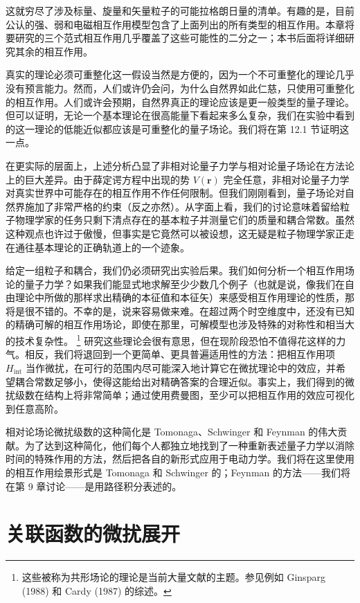 这就穷尽了涉及标量、旋量和矢量粒子的可能拉格朗日量的清单。有趣的是，目前公认的强、弱和电磁相互作用模型包含了上面列出的所有类型的相互作用。本章将要研究的三个范式相互作用几乎覆盖了这些可能性的二分之一；本书后面将详细研究其余的相互作用。

真实的理论必须可重整化这一假设当然是方便的，因为一个不可重整化的理论几乎没有预言能力。然而，人们或许仍会问，为什么自然界如此仁慈，只使用可重整化的相互作用。人们或许会预期，自然界真正的理论应该是更一般类型的量子理论。但可以证明，无论一个基本理论在很高能量下看起来多么复杂，我们在实验中看到的这一理论的低能近似都应该是可重整化的量子场论。我们将在第 12.1 节证明这一点。

在更实际的层面上，上述分析凸显了非相对论量子力学与相对论量子场论在方法论上的巨大差异。由于薛定谔方程中出现的势 $V(\mathbf{r})$ 完全任意，非相对论量子力学对真实世界中可能存在的相互作用不作任何限制。但我们刚刚看到，量子场论对自然界施加了非常严格的约束（反之亦然）。从字面上看，我们的讨论意味着留给粒子物理学家的任务只剩下清点存在的基本粒子并测量它们的质量和耦合常数。虽然这种观点也许过于傲慢，但事实是它竟然可以被设想，这无疑是粒子物理学家正走在通往基本理论的正确轨道上的一个迹象。

给定一组粒子和耦合，我们仍必须研究出实验后果。我们如何分析一个相互作用场论的量子力学？如果我们能显式地求解至少少数几个例子（也就是说，像我们在自由理论中所做的那样求出精确的本征值和本征矢）来感受相互作用理论的性质，那将是很不错的。不幸的是，说来容易做来难。在超过两个时空维度中，还没有已知的精确可解的相互作用场论，即使在那里，可解模型也涉及特殊的对称性和相当大的技术复杂性。%
\footnote{这些被称为共形场论的理论是当前大量文献的主题。参见例如 Ginsparg (1988) 和 Cardy (1987) 的综述。}
研究这些理论会很有意思，但在现阶段恐怕不值得花这样的力气。相反，我们将退回到一个更简单、更具普遍适用性的方法：把相互作用项 $H_{\mathrm{int}}$ 当作微扰，在可行的范围内尽可能深入地计算它在微扰理论中的效应，并希望耦合常数足够小，使得这能给出对精确答案的合理近似。事实上，我们得到的微扰级数在结构上将非常简单；通过使用费曼图，至少可以把相互作用的效应可视化到任意高阶。

相对论场论微扰级数的这种简化是 Tomonaga、Schwinger 和 Feynman 的伟大贡献。为了达到这种简化，他们每个人都独立地找到了一种重新表述量子力学以消除时间的特殊作用的方法，然后把各自的新形式应用于电动力学。我们将在这里使用的相互作用绘景形式是 Tomonaga 和 Schwinger 的；Feynman 的方法——我们将在第 9 章讨论——是用路径积分表述的。

\section{关联函数的微扰展开}

